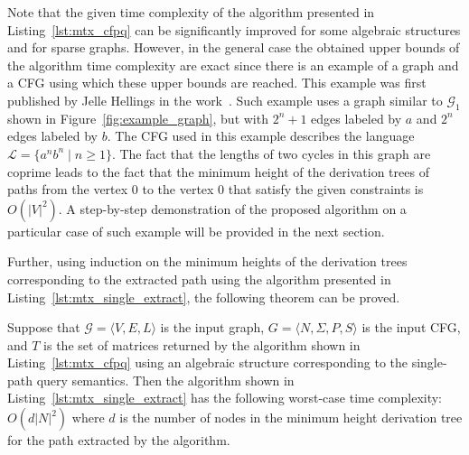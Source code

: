 Note that the given time complexity of the algorithm presented in Listing~\ref{lst:mtx_cfpq} can be significantly improved for some algebraic structures and for sparse graphs. However, in the general case the obtained upper bounds of the algorithm time complexity are exact since there is an example of a graph and a CFG using which these upper bounds are reached. This example was first published by Jelle Hellings in the work~\cite{hellings2015querying}. Such example uses a graph similar to $\mathcal{G}_1$ shown in Figure~\ref{fig:example_graph}, but with $2^n + 1$ edges labeled by $a$ and $2^n$ edges labeled by $b$. The CFG used in this example describes the language $\mathcal{L} = \{a^nb^n \mid n \geq 1\}$. The fact that the lengths of two cycles in this graph are coprime leads to the fact that the minimum height of the derivation trees of paths from the vertex 0 to the vertex 0 that satisfy the given constraints is $O(|V|^2)$. A step-by-step demonstration of the proposed algorithm on a particular case of such example will be provided in the next section.

Further, using induction on the minimum heights of the derivation trees corresponding to the extracted path using the algorithm presented in Listing~\ref{lst:mtx_single_extract}, the following theorem can be proved.

\begin{theorem}\label{thm:time_single_mtx}
	Suppose that $\mathcal{G} = \langle V, E, L \rangle$ is the input graph, $G = \langle N, \Sigma, P, S \rangle$ is the input CFG, and $T$ is the set of matrices returned by the algorithm shown in Listing~\ref{lst:mtx_cfpq} using an algebraic structure corresponding to the single-path query semantics. Then the algorithm shown in Listing~\ref{lst:mtx_single_extract} has the following worst-case time complexity: $O(d|N|^2)$ where $d$ is the number of nodes in the minimum height derivation tree for the path extracted by the algorithm.
\end{theorem}

